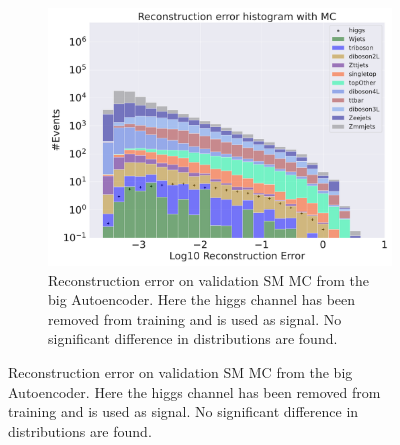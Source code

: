 \begin{figure}[h!]
\begin{subfigure}{.45\textwidth}
        \includegraphics[width=\textwidth]{Figures/AE_testing/big/b_data_recon_big_rm3_feats_sig_higgs.pdf}
        \caption{Reconstruction error on validation SM MC from the big Autoencoder. Here the higgs channel has been removed from training and 
        is used as signal. No significant difference in distributions are found. }
        \label{fig:ae_big_higgs}
    \end{subfigure}
    \hfill  
    \label{fig:ae_big_channel_1}
\end{figure}

